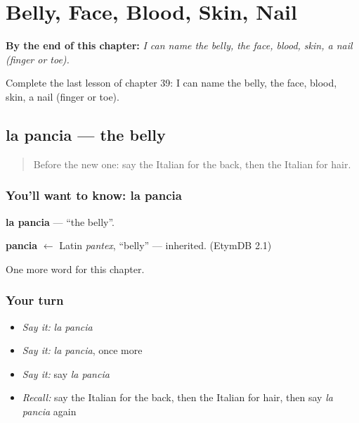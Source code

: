 
\chapter{Belly, Face, Blood, Skin, Nail}
\label{ch:it-belly-face-blood-skin-nail}

\begin{chapteropening}
\textbf{By the end of this chapter:} \emph{I can name the belly, the face, blood, skin, a nail (finger or toe).}

Complete the last lesson of chapter 39: I can name the belly, the face, blood, skin, a nail (finger or toe).
\end{chapteropening}

\section[la pancia]{la pancia — the belly}

\label{lesson:IT-C39-pancia}



\begin{quote}
Before the new one: say the Italian for the back, then the Italian for hair.
\end{quote}

\subsection*{You'll want to know: la pancia}
\textbf{la pancia} — \textquotedblleft{}the belly\textquotedblright{}.

\begin{cousinweb}
\textbf{pancia} $\leftarrow$ Latin \emph{pantex}, \textquotedblleft{}belly\textquotedblright{} — inherited. (EtymDB 2.1)
\end{cousinweb}

\begin{grammarlens}[title={What you've built}]
One more word for this chapter.
\end{grammarlens}

\subsection*{Your turn}
\begin{itemize}
\raggedright
  \item \emph{Say it:} \emph{la pancia}
  \item \emph{Say it:} \emph{la pancia}, once more
  \item \emph{Say it:} say \emph{la pancia}
  \item \emph{Recall:} say the Italian for the back, then the Italian for hair, then say \emph{la pancia} again
\end{itemize}

